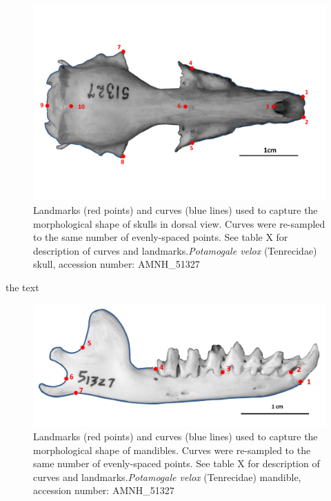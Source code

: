 \documentclass[12pt,a4paper]{article}
\begin{document}
\begin{figure}[H]
\centering
\includegraphics[width=1\linewidth]{figures/AMNH_51327_dorsallandmarksdiagram.png}
\caption{Landmarks (red points) and curves (blue lines) used to capture the morphological shape of skulls in dorsal view. Curves were re-sampled to the same number of evenly-spaced points. See table X for description of curves and landmarks.\textit{Potamogale velox} (Tenrecidae) skull, accession number: AMNH\_51327}
\label{dorslandmarks}
\end{figure}



\begin{table}[H]			
\centering
\caption{Descriptions of the landmarks (points) and curves (semilandmarks) for the skulls in dorsal view (see Figure \ref{dorslandmarks}).}
\label{dorslanddesc}  the text
\end{table}

\begin{figure}[H]
\centering
\includegraphics[width=1\linewidth]{figures/AMNH_51327_landmarksdiagram.png}

\caption{Landmarks (red points) and curves (blue lines) used to capture the morphological shape of mandibles. Curves were re-sampled to the same number of evenly-spaced points. See table X for description of curves and landmarks.\textit{Potamogale velox} (Tenrecidae) mandible, accession number: AMNH\_51327}
\label{mandslandmarks}
\end{figure}
\end{document}
